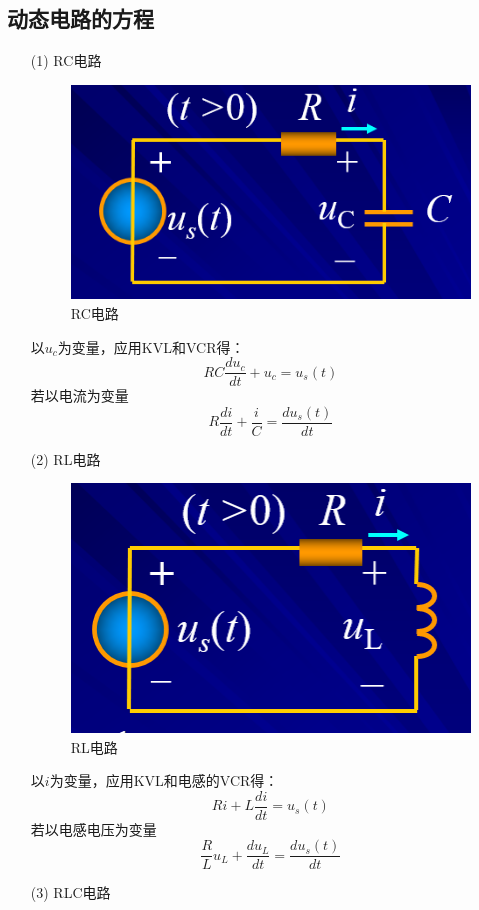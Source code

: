 \documentclass[11pt,a4paper,oneside]{book}
\begin{document}
\subsection{动态电路的方程}
\begin{enumerate}
	\item[(1)]RC电路
	
	\begin{figure}[H]
		\centering
		\includegraphics[width=0.5\linewidth]{screenshot078}
		\caption{RC电路}
		\label{fig:screenshot078}
	\end{figure}
	以$u_c$为变量，应用KVL和VCR得：
	\begin{equation}
		RC\frac{du_c}{dt}+u_c=u_s(t)
	\end{equation}
	若以电流为变量
	\begin{equation}
		R\frac{di}{dt}+\frac{i}{C}=\frac{du_s(t)}{dt}
	\end{equation}
	
	\item[(2)]RL电路
	
	\begin{figure}[H]
		\centering
		\includegraphics[width=0.5\linewidth]{screenshot079}
		\caption{RL电路}
		\label{fig:screenshot079}
	\end{figure}
	以$i$为变量，应用KVL和电感的VCR得：
	\begin{equation}
		Ri+L\frac{di}{dt}=u_s(t)
	\end{equation}
	若以电感电压为变量
	\begin{equation}
		\frac{R}{L}u_L+\frac{du_L}{dt}=\frac{du_s(t)}{dt}
	\end{equation}

	\item[(3)]RLC电路
	

\end{enumerate}
\end{document}
